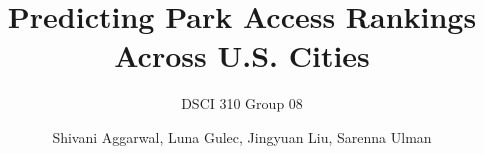 \documentclass[
  letterpaper,
  DIV=11,
  numbers=noendperiod]{scrartcl}
\title{Predicting Park Access Rankings Across U.S. Cities}
\subtitle{DSCI 310 Group 08}
\author{Shivani Aggarwal, Luna Gulec, Jingyuan Liu, Sarenna Ulman}
\date{}
\renewcommand*\contentsname{Table of contents}
\newcommand\contentsname{Table of contents}
\begin{document}
\maketitle

\renewcommand*\contentsname{Table of contents}
{
\hypersetup{linkcolor=}
\setcounter{tocdepth}{3}
\tableofcontents
}
\end{document}

